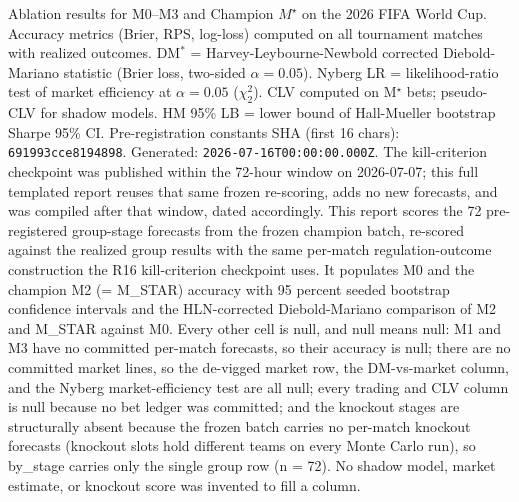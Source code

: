 \caption{
  Ablation results for M0--M3 and Champion $M^\star$ on the 2026 FIFA World Cup. 
  Accuracy metrics (Brier, RPS, log-loss) computed on all tournament matches with realized outcomes. 
  DM$^*$ = Harvey-Leybourne-Newbold corrected Diebold-Mariano statistic (Brier loss, two-sided $\alpha=0.05$). 
  Nyberg LR = likelihood-ratio test of market efficiency at $\alpha=0.05$ ($\chi^2_2$). 
  CLV computed on M$^\star$ bets; pseudo-CLV for shadow models. 
  HM 95\% LB = lower bound of Hall-Mueller bootstrap Sharpe 95\% CI. 
  Pre-registration constants SHA (first 16 chars): \texttt{691993cce8194898}.
  Generated: \texttt{2026-07-16T00:00:00.000Z}.
  The kill-criterion checkpoint was published within the 72-hour window on 2026-07-07; this full templated report reuses that same frozen re-scoring, adds no new forecasts, and was compiled after that window, dated accordingly. This report scores the 72 pre-registered group-stage forecasts from the frozen champion batch, re-scored against the realized group results with the same per-match regulation-outcome construction the R16 kill-criterion checkpoint uses. It populates M0 and the champion M2 (= M\_STAR) accuracy with 95 percent seeded bootstrap confidence intervals and the HLN-corrected Diebold-Mariano comparison of M2 and M\_STAR against M0. Every other cell is null, and null means null: M1 and M3 have no committed per-match forecasts, so their accuracy is null; there are no committed market lines, so the de-vigged market row, the DM-vs-market column, and the Nyberg market-efficiency test are all null; every trading and CLV column is null because no bet ledger was committed; and the knockout stages are structurally absent because the frozen batch carries no per-match knockout forecasts (knockout slots hold different teams on every Monte Carlo run), so by\_stage carries only the single group row (n = 72). No shadow model, market estimate, or knockout score was invented to fill a column.
}
